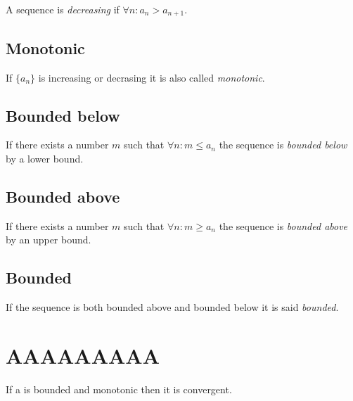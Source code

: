 \documentclass[a4paper]{article}
\begin{document}
A sequence is \textit{decreasing} if \(\forall n:  a_n>a_{n+1}\).

\subsection{Monotonic}

If \(\{a_n\}\) is increasing or decrasing it is also called \textit{monotonic}.

\subsection{Bounded below}

If there exists a number \(m\) such that \(\forall n : m \leq a_n\)
the sequence is \textit{bounded below} by a lower bound.

\subsection{Bounded above}

If there exists a number \(m\) such that \(\forall n : m \geq a_n\)
the sequence is \textit{bounded above} by an upper bound.

\subsection{Bounded}

If the sequence is both bounded above and bounded below it is
said \textit{bounded}.

\section{AAAAAAAAA}

If a is bounded and monotonic then it is convergent.

\pagebreak
\end{document}
